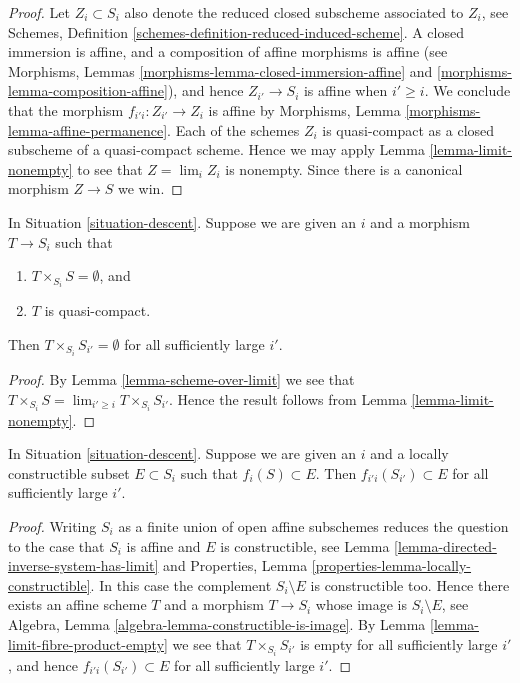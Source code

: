 \begin{proof}
Let $Z_i \subset S_i$ also denote the reduced closed subscheme
associated to $Z_i$, see Schemes,
Definition \ref{schemes-definition-reduced-induced-scheme}.
A closed immersion is affine, and a composition of affine
morphisms is affine (see
Morphisms, Lemmas \ref{morphisms-lemma-closed-immersion-affine}
and \ref{morphisms-lemma-composition-affine}), and hence $Z_{i'} \to S_i$ is
affine when $i' \geq i$. We conclude that the morphism
$f_{i'i} : Z_{i'} \to Z_i$ is affine by
Morphisms, Lemma \ref{morphisms-lemma-affine-permanence}.
Each of the schemes $Z_i$ is quasi-compact as a closed
subscheme of a quasi-compact scheme. Hence we may apply
Lemma \ref{lemma-limit-nonempty} to see that
$Z = \lim_i Z_i$ is nonempty. Since there is a
canonical morphism $Z \to S$ we win.
\end{proof}

\begin{lemma}
\label{lemma-limit-fibre-product-empty}
In Situation \ref{situation-descent}.
Suppose we are given an $i$ and a morphism $T \to S_i$ such that
\begin{enumerate}
\item $T \times_{S_i} S = \emptyset$, and
\item $T$ is quasi-compact.
\end{enumerate}
Then $T \times_{S_i} S_{i'} = \emptyset$ for all sufficiently large $i'$.
\end{lemma}

\begin{proof}
By Lemma \ref{lemma-scheme-over-limit}
we see that $T \times_{S_i} S = \lim_{i' \geq i} T \times_{S_i} S_{i'}$.
Hence the result follows from
Lemma \ref{lemma-limit-nonempty}.
\end{proof}

\begin{lemma}
\label{lemma-limit-contained-in-constructible}
In Situation \ref{situation-descent}.
Suppose we are given an $i$ and a locally constructible subset
$E \subset S_i$ such that $f_i(S) \subset E$.
Then $f_{i'i}(S_{i'}) \subset E$ for all sufficiently large $i'$.
\end{lemma}

\begin{proof}
Writing $S_i$ as a finite union of open affine subschemes reduces
the question to the case that $S_i$ is affine and $E$ is constructible, see
Lemma \ref{lemma-directed-inverse-system-has-limit}
and
Properties, Lemma \ref{properties-lemma-locally-constructible}.
In this case the complement $S_i \setminus E$ is constructible too.
Hence there exists an affine scheme $T$ and a morphism $T \to S_i$
whose image is $S_i \setminus E$, see
Algebra, Lemma \ref{algebra-lemma-constructible-is-image}.
By
Lemma \ref{lemma-limit-fibre-product-empty}
we see that $T \times_{S_i} S_{i'}$ is empty for all sufficiently large
$i'$, and hence $f_{i'i}(S_{i'}) \subset E$ for all sufficiently large $i'$.
\end{proof}

